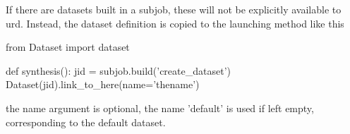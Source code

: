 If there are datasets built in a subjob, these will not be explicitly
available to urd.  Instead, the dataset definition is copied to the
launching method like this

\begin{python}
from Dataset import dataset

def synthesis():
  jid = subjob.build('create_dataset')
  Dataset(jid).link_to_here(name='thename')
\end{python}
the name argument is optional, the name 'default' is used if left
empty, corresponding to the default dataset.
